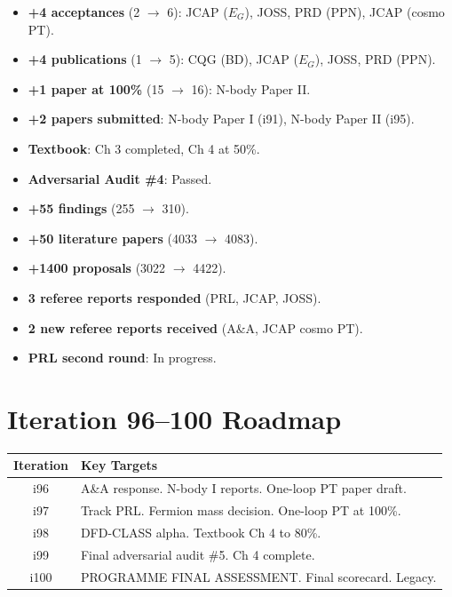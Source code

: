 \documentclass[11pt,a4paper]{article}
\begin{document}
\begin{tcolorbox}[colback=green!5!white, colframe=dfdgreen, title=\textbf{What Changed in i91--i95 (5 iterations)}]
\begin{itemize}[nosep]
\item \textbf{+4 acceptances} (2 $\to$ 6): JCAP ($E_G$), JOSS, PRD (PPN), JCAP (cosmo PT).
\item \textbf{+4 publications} (1 $\to$ 5): CQG (BD), JCAP ($E_G$), JOSS, PRD (PPN).
\item \textbf{+1 paper at 100\%} (15 $\to$ 16): N-body Paper II.
\item \textbf{+2 papers submitted}: N-body Paper I (i91), N-body Paper II (i95).
\item \textbf{Textbook}: Ch 3 completed, Ch 4 at 50\%.
\item \textbf{Adversarial Audit \#4}: Passed.
\item \textbf{+55 findings} (255 $\to$ 310).
\item \textbf{+50 literature papers} (4033 $\to$ 4083).
\item \textbf{+1400 proposals} (3022 $\to$ 4422).
\item \textbf{3 referee reports responded} (PRL, JCAP, JOSS).
\item \textbf{2 new referee reports received} (A\&A, JCAP cosmo PT).
\item \textbf{PRL second round}: In progress.
\end{itemize}
\end{tcolorbox}

\section{Iteration 96--100 Roadmap}

\begin{tcolorbox}[colback=blue!5!white, colframe=dfdblue, title=\textbf{THE FINAL FIVE: i96--i100 Plan}]
\begin{center}
\begin{tabular}{cl}
\toprule
\textbf{Iteration} & \textbf{Key Targets} \\
\midrule
i96 & A\&A response. N-body I reports. One-loop PT paper draft. \\
i97 & Track PRL. Fermion mass decision. One-loop PT at 100\%. \\
i98 & DFD-CLASS alpha. Textbook Ch 4 to 80\%. \\
i99 & Final adversarial audit \#5. Ch 4 complete. \\
i100 & PROGRAMME FINAL ASSESSMENT. Final scorecard. Legacy. \\
\bottomrule
\end{tabular}
\end{center}
\end{tcolorbox}
\end{document}
